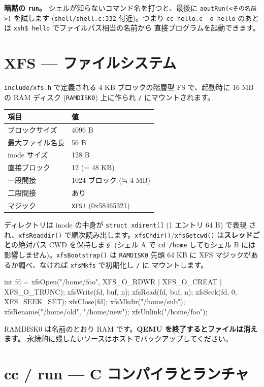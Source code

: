 \documentclass[a4paper,11pt]{ltjsarticle}
\begin{document}
\textbf{暗黙の \texttt{run}。} シェルが知らないコマンド名を打つと、最後に
\verb|aoutRun(<その名前>)| を試します (\verb|shell/shell.c:332| 付近)。つまり
\verb|cc hello.c -o hello| のあとは \verb|xsh$ hello| でファイルパス相当の名前から
直接プログラムを起動できます。

\section{XFS --- ファイルシステム}
\verb|include/xfs.h| で定義される 4 KB ブロックの階層型 FS で、起動時に 16 MB の
RAM ディスク (\verb|RAMDISK0|) 上に作られ \verb|/| にマウントされます。
\begin{center}\footnotesize
\begin{tabular}{@{}l l@{}}
\toprule \textbf{項目} & \textbf{値}\\ \midrule
ブロックサイズ & 4096 B\\
最大ファイル名長 & 56 B\\
inode サイズ & 128 B\\
直接ブロック & 12 (= 48 KB)\\
一段間接 & 1024 ブロック (≒ 4 MB)\\
二段間接 & あり\\
マジック & \verb|XFS!| (0x58465321)\\
\bottomrule
\end{tabular}
\end{center}
ディレクトリは inode の中身が \verb|struct xdirent[]| (1 エントリ 64 B) で表現
され、\verb|xfsReaddir()| で順次読み出します。\verb|xfsChdir()|/\verb|xfsGetcwd()|
は\textbf{スレッドごと}の絶対パス CWD を保持します (シェル A で \verb|cd /home|
してもシェル B には影響しません)。\verb|xfsBootstrap()| は \verb|RAMDISK0| 先頭
64 KB に XFS マジックがあるか調べ、なければ \verb|xfsMkfs| で初期化し \verb|/| に
マウントします。
\begin{code}
int fd = xfsOpen("/home/foo", XFS_O_RDWR | XFS_O_CREAT | XFS_O_TRUNC);
xfsWrite(fd, buf, n);  xfsRead(fd, buf, n);
xfsSeek(fd, 0, XFS_SEEK_SET);  xfsClose(fd);
xfsMkdir("/home/sub");  xfsRename("/home/old", "/home/new");  xfsUnlink("/home/foo");
\end{code}
RAMDISK0 は名前のとおり RAM です。\textbf{QEMU を終了するとファイルは消えます。}
永続的に残したいソースはホストでバックアップしてください。

\section{cc / run --- C コンパイラとランチャ}
\end{document}
